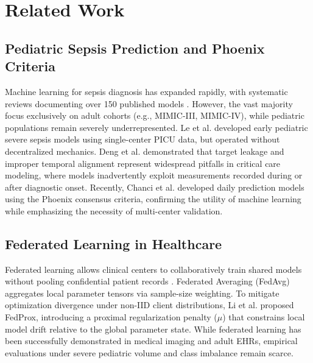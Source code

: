 \documentclass[conference,a4paper]{IEEEtran}
\begin{document}
\section{Related Work}\label{sec:litreview}

\subsection{Pediatric Sepsis Prediction and Phoenix Criteria}
Machine learning for sepsis diagnosis has expanded rapidly, with systematic reviews documenting over 150 published models \cite{fleuren2020ml,yang2023sepsis}. However, the vast majority focus exclusively on adult cohorts (e.g., MIMIC-III, MIMIC-IV), while pediatric populations remain severely underrepresented. Le et al. \cite{le2019pediatric} developed early pediatric severe sepsis models using single-center PICU data, but operated without decentralized mechanics. Deng et al. \cite{deng2022evaluating} demonstrated that target leakage and improper temporal alignment represent widespread pitfalls in critical care modeling, where models inadvertently exploit measurements recorded during or after diagnostic onset. Recently, Chanci et al. \cite{chanci2025machine} developed daily prediction models using the Phoenix consensus criteria, confirming the utility of machine learning while emphasizing the necessity of multi-center validation.

\subsection{Federated Learning in Healthcare}
Federated learning allows clinical centers to collaboratively train shared models without pooling confidential patient records \cite{mcmahan2017fedavg}. Federated Averaging (FedAvg) aggregates local parameter tensors via sample-size weighting. To mitigate optimization divergence under non-IID client distributions, Li et al. \cite{li2020fedprox} proposed FedProx, introducing a proximal regularization penalty ($\mu$) that constrains local model drift relative to the global parameter state. While federated learning has been successfully demonstrated in medical imaging and adult EHRs, empirical evaluations under severe pediatric volume and class imbalance remain scarce.
\end{document}
